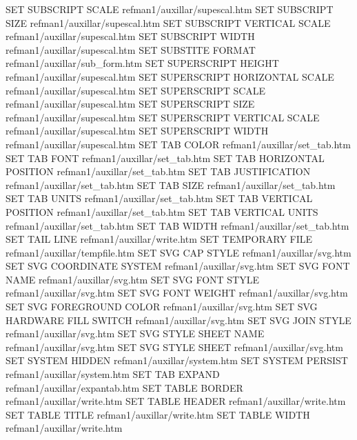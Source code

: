 SET SUBSCRIPT SCALE                     refman1/auxillar/supescal.htm
SET SUBSCRIPT SIZE                      refman1/auxillar/supescal.htm
SET SUBSCRIPT VERTICAL SCALE            refman1/auxillar/supescal.htm
SET SUBSCRIPT WIDTH                     refman1/auxillar/supescal.htm
SET SUBSTITE FORMAT                     refman1/auxillar/sub_form.htm
SET SUPERSCRIPT HEIGHT                  refman1/auxillar/supescal.htm
SET SUPERSCRIPT HORIZONTAL SCALE        refman1/auxillar/supescal.htm
SET SUPERSCRIPT SCALE                   refman1/auxillar/supescal.htm
SET SUPERSCRIPT SIZE                    refman1/auxillar/supescal.htm
SET SUPERSCRIPT VERTICAL SCALE          refman1/auxillar/supescal.htm
SET SUPERSCRIPT WIDTH                   refman1/auxillar/supescal.htm
SET TAB COLOR                           refman1/auxillar/set_tab.htm
SET TAB FONT                            refman1/auxillar/set_tab.htm
SET TAB HORIZONTAL POSITION             refman1/auxillar/set_tab.htm
SET TAB JUSTIFICATION                   refman1/auxillar/set_tab.htm
SET TAB SIZE                            refman1/auxillar/set_tab.htm
SET TAB UNITS                           refman1/auxillar/set_tab.htm
SET TAB VERTICAL POSITION               refman1/auxillar/set_tab.htm
SET TAB VERTICAL UNITS                  refman1/auxillar/set_tab.htm
SET TAB WIDTH                           refman1/auxillar/set_tab.htm
SET TAIL LINE                           refman1/auxillar/write.htm
SET TEMPORARY FILE                      refman1/auxillar/tempfile.htm
SET SVG CAP STYLE                       refman1/auxillar/svg.htm
SET SVG COORDINATE SYSTEM               refman1/auxillar/svg.htm
SET SVG FONT NAME                       refman1/auxillar/svg.htm
SET SVG FONT STYLE                      refman1/auxillar/svg.htm
SET SVG FONT WEIGHT                     refman1/auxillar/svg.htm
SET SVG FOREGROUND COLOR                refman1/auxillar/svg.htm
SET SVG HARDWARE FILL SWITCH            refman1/auxillar/svg.htm
SET SVG JOIN STYLE                      refman1/auxillar/svg.htm
SET SVG STYLE SHEET NAME                refman1/auxillar/svg.htm
SET SVG STYLE SHEET                     refman1/auxillar/svg.htm
SET SYSTEM HIDDEN                       refman1/auxillar/system.htm
SET SYSTEM PERSIST                      refman1/auxillar/system.htm
SET TAB EXPAND                          refman1/auxillar/expantab.htm
SET TABLE BORDER                        refman1/auxillar/write.htm
SET TABLE HEADER                        refman1/auxillar/write.htm
SET TABLE TITLE                         refman1/auxillar/write.htm
SET TABLE WIDTH                         refman1/auxillar/write.htm
